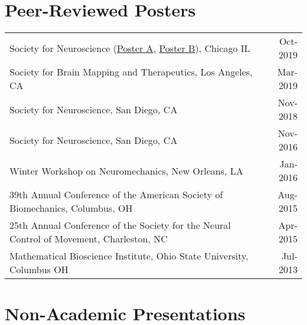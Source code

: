 \documentclass[10pt,a4paper]{article}
\begin{document}
\vspace*{2mm}\section*{Peer-Reviewed Posters}

  \vspace*{1mm}\noindent\begin{tabularx}{17cm}{X r}
    Society for Neuroscience (\href{https://github.com/bc/resume/raw/master/conferences/sfn2019a.pdf}{Poster A}, \href{https://github.com/bc/resume/raw/master/conferences/sfn2019a.pdf}{Poster B}), Chicago IL & Oct-2019 \\ %
    Society for Brain Mapping and Therapeutics, Los Angeles, CA & Mar-2019 \\ %
    Society for Neuroscience, San Diego, CA & Nov-2018 \\ %
    Society for Neuroscience, San Diego, CA& Nov-2016 \\ 
    Winter Workshop on Neuromechanics, New Orleans, LA & Jan-2016 \\ %
    39th Annual Conference of the American Society of Biomechanics, Columbus, OH & Aug-2015 \\
    25th Annual Conference of the Society for the Neural Control of Movement, Charleston, NC & Apr-2015 \\
    Mathematical Bioscience Institute, Ohio State University, Columbus OH & Jul-2013\\
  \end{tabularx}


  \vspace*{2mm}\section*{Non-Academic Presentations}
\end{document}
